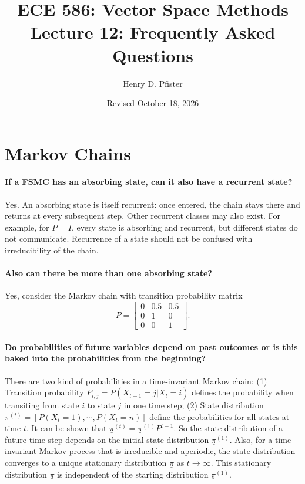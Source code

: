 \documentclass[10pt,english]{article}
\begin{document}
\title{ECE 586: Vector Space Methods \\ Lecture 12: Frequently Asked Questions}
\author{Henry D. Pfister \\ \univ}
\date{Revised October 18, 2026}

\maketitle

\section{Markov Chains}

\paragraph{If a FSMC has an absorbing state, can it also have a recurrent state?}


Yes. An absorbing state is itself recurrent: once entered, the chain stays there and returns at every subsequent step.
Other recurrent classes may also exist.
For example, for $P=I$, every state is absorbing and recurrent, but different states do not communicate.
Recurrence of a state should not be confused with irreducibility of the chain.


\paragraph{Also can there be more than one absorbing state?} Yes, consider the Markov chain with transition probability matrix
$$P=\begin{bmatrix} 0 & 0.5 & 0.5 \\ 0 & 1 & 0 \\ 0 & 0 & 1 \end{bmatrix}.$$

\paragraph{Do probabilities of future variables depend on past outcomes or is this baked into the probabilities from the beginning?}

There are two kind of probabilities in a time-invariant Markov chain: (1) Transition probability $P_{i,j} =P(X_{t+1}=j|X_{t}=i)$ defines the probability when transiting from state $i$ to state $j$ in one time step; (2) State distribution $\underline{\pi}^{(t)}=[P(X_t=1), \cdots, P(X_t=n)]$ define the probabilities for all states at time $t$. It can be shown that $\underline{\pi}^{(t)}=\underline{\pi}^{(1)}P^{t-1}$. So the state distribution of a future time step depends on the initial state distribution $\underline{\pi}^{(1)}$. Also, for a time-invariant Markov process that is irreducible and aperiodic, the state distribution converges to a unique stationary distribution $\underline{\pi}$ as $t \rightarrow \infty$. This stationary distribution $\underline{\pi}$ is independent of the starting distribution $\underline{\pi}^{(1)}$.
\end{document}
